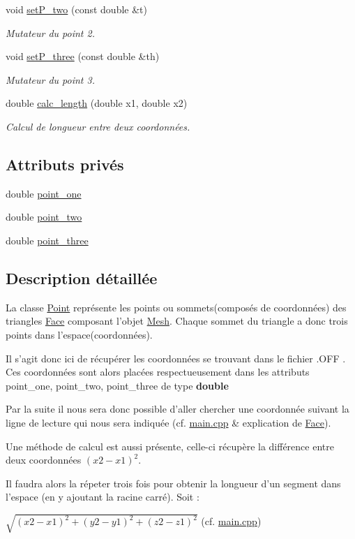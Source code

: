 \begin{DoxyCompactItemize}
void \hyperlink{class_point_a3b70e89e253f5339392990ae29313ae8}{set\-P\-\_\-two} (const double \&t)
\begin{DoxyCompactList}\small\item\em Mutateur du point 2. \end{DoxyCompactList}\item 
void \hyperlink{class_point_a097d97049b319bb131b51f990a52aa94}{set\-P\-\_\-three} (const double \&th)
\begin{DoxyCompactList}\small\item\em Mutateur du point 3. \end{DoxyCompactList}\item 
double \hyperlink{class_point_a1caba2edf0ae2ddef66114b029b99008}{calc\-\_\-length} (double x1, double x2)
\begin{DoxyCompactList}\small\item\em Calcul de longueur entre deux coordonnées. \end{DoxyCompactList}\end{DoxyCompactItemize}
\subsection*{Attributs privés}
\begin{DoxyCompactItemize}
\item 
double \hyperlink{class_point_a030522c3949dc71bc4c1f39eb1b0c77e}{point\-\_\-one}
\item 
double \hyperlink{class_point_a7eece7f7413a741137cf32bb763f3987}{point\-\_\-two}
\item 
double \hyperlink{class_point_af7cb3c4c0c0f52218ac9ce180df003da}{point\-\_\-three}
\end{DoxyCompactItemize}


\subsection{Description détaillée}
La classe \hyperlink{class_point}{Point} représente les points ou sommets(composés de coordonnées) des triangles \hyperlink{class_face}{Face} composant l'objet \hyperlink{class_mesh}{Mesh}. Chaque sommet du triangle a donc trois points dans l'espace(coordonnées). \par
Il s'agit donc ici de récupérer les coordonnées se trouvant dans le fichier .O\-F\-F . Ces coordonnées sont alors placées respectueusement dans les attributs point\-\_\-one, point\-\_\-two, point\-\_\-three de type {\bfseries double} \par
Par la suite il nous sera donc possible d'aller chercher une coordonnée suivant la ligne de lecture qui nous sera indiquée (cf. \hyperlink{main_8cpp}{main.\-cpp} \& explication de \hyperlink{class_face}{Face}). \par
Une méthode de calcul est aussi présente, celle-\/ci récupère la différence entre deux coordonnées $(x2-x1)^2$. \par
Il faudra alors la répeter trois fois pour obtenir la longueur d'un segment dans l'espace (en y ajoutant la racine carré). Soit \-: \par
 $\sqrt{(x2-x1)^2+(y2-y1)^2+(z2-z1)^2}$ (cf. \hyperlink{main_8cpp}{main.\-cpp}) 


